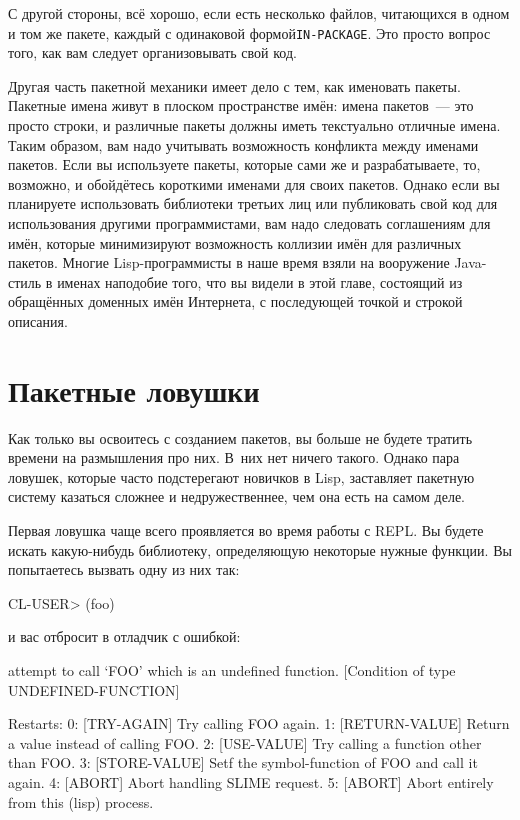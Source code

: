 С другой стороны, всё хорошо, если есть несколько файлов, читающихся в одном и том же
пакете, каждый с одинаковой формой\lstinline{IN-PACKAGE}. Это просто вопрос того, как вам
следует организовывать свой код.

Другая часть пакетной механики имеет дело с тем, как именовать пакеты. Пакетные имена
живут в плоском пространстве имён: имена пакетов~--- это просто строки, и различные пакеты
должны иметь текстуально отличные имена. Таким образом, вам надо учитывать возможность
конфликта между именами пакетов. Если вы ис\-поль\-зуе\-те пакеты, которые сами же и
разрабатываете, то, возможно, и обойдётесь короткими именами для своих пакетов. Однако если
вы планируете использовать библиотеки третьих лиц или публиковать свой код для
использования другими программистами, вам надо следовать соглашениям для имён, которые
минимизируют возможность коллизии имён для различных пакетов. Многие Lisp-программисты в
наше время взяли на вооружение Java-стиль в именах наподобие того, что вы видели в этой
главе, состоящий из обращённых доменных имён Интернета, с последующей точкой и строкой
описания.

\section{Пакетные ловушки}
\label{sec:21-pitfalls}

Как только вы освоитесь с созданием пакетов, вы больше не будете тратить времени на
размышления про них. В~них нет ничего такого. Однако пара ловушек, которые часто
подстерегают новичков в Lisp, заставляет пакетную систему казаться сложнее и
недружественнее, чем она есть на самом деле.

Первая ловушка чаще всего проявляется во время работы с REPL. Вы будете искать
какую-нибудь библиотеку, определяющую некоторые нужные функции. Вы попытаетесь вызвать
одну из них так:

\begin{myverb}
CL-USER> (foo)
\end{myverb}

\noindent{}и вас отбросит в отладчик с ошибкой:

\begin{myverb}
attempt to call `FOO' which is an undefined function.
   [Condition of type UNDEFINED-FUNCTION]

Restarts:
  0: [TRY-AGAIN] Try calling FOO again.
  1: [RETURN-VALUE] Return a value instead of calling FOO.
  2: [USE-VALUE] Try calling a function other than FOO.
  3: [STORE-VALUE] Setf the symbol-function of FOO and call it again.
  4: [ABORT] Abort handling SLIME request.
  5: [ABORT] Abort entirely from this (lisp) process.
\end{myverb}

